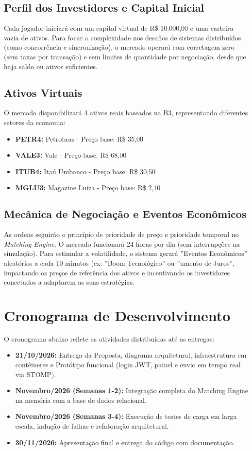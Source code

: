 \documentclass[12pt,a4paper]{article}
\begin{document}
\subsection{Perfil dos Investidores e Capital Inicial}
Cada jogador iniciará com um capital virtual de R\$ 10.000,00 e uma carteira vazia de ativos. Para focar a complexidade nos desafios de sistemas distribuídos (como concorrência e sincronização), o mercado operará com corretagem zero (sem taxas por transação) e sem limites de quantidade por negociação, desde que haja saldo ou ativos suficientes.

\subsection{Ativos Virtuais}
O mercado disponibilizará 4 ativos reais baseados na B3, representando diferentes setores da economia:
\begin{itemize}
    \item \textbf{PETR4:} Petrobras - Preço base: R\$ 35,00
    \item \textbf{VALE3:} Vale - Preço base: R\$ 68,00
    \item \textbf{ITUB4:} Itaú Unibanco - Preço base: R\$ 30,50
    \item \textbf{MGLU3:} Magazine Luiza - Preço base: R\$ 2,10
\end{itemize}

\subsection{Mecânica de Negociação e Eventos Econômicos}
As ordens seguirão o princípio de prioridade de preço e prioridade temporal no \textit{Matching Engine}. O mercado funcionará 24 horas por dia (sem interrupções na simulação). Para estimular a volatilidade, o sistema gerará ''Eventos Econômicos'' aleatórios a cada 10 minutos (ex: ''Boom Tecnológico'' ou ''umento de Juros'', impactando os preços de referência dos ativos e incentivando os investidores conectados a adaptarem as suas estratégias.


\section{Cronograma de Desenvolvimento}
O cronograma abaixo reflete as atividades distribuídas até as entregas:
\begin{itemize}
    \item \textbf{21/10/2026:} Entrega da Proposta, diagrama arquitetural, infraestrutura em contêineres e Protótipo funcional (login JWT, painel e envio em tempo real via STOMP).
    \item \textbf{Novembro/2026 (Semanas 1-2):} Integração completa do Matching Engine na memória com a base de dados relacional.
    \item \textbf{Novembro/2026 (Semanas 3-4):} Execução de testes de carga em larga escala, indução de falhas e refatoração arquitetural.
    \item \textbf{30/11/2026:} Apresentação final e entrega do código com documentação.
\end{itemize}
\end{document}
